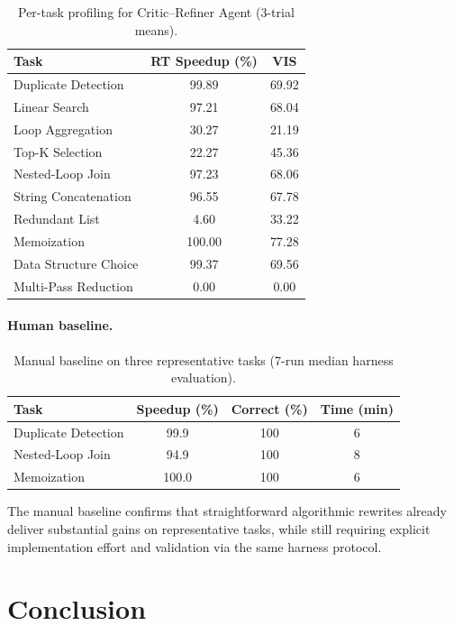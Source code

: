 \documentclass{article}
\begin{document}
\begin{table}[h]
\centering
\caption{Per-task profiling for Critic--Refiner Agent (3-trial means).}
\label{tab:agent_pertask}
\small
\begin{tabular}{lcc}
\toprule
\textbf{Task} & \textbf{RT Speedup (\%)} & \textbf{VIS} \\
\midrule
Duplicate Detection   & 99.89 & 69.92 \\
Linear Search         & 97.21 & 68.04 \\
Loop Aggregation      & 30.27 & 21.19 \\
Top-K Selection       & 22.27 & 45.36 \\
Nested-Loop Join      & 97.23 & 68.06 \\
String Concatenation  & 96.55 & 67.78 \\
Redundant List        & 4.60  & 33.22 \\
Memoization           & 100.00 & 77.28 \\
Data Structure Choice & 99.37 & 69.56 \\
Multi-Pass Reduction  & 0.00  & 0.00 \\
\bottomrule
\end{tabular}
\end{table}

\paragraph{Human baseline.}
\begin{table}[H]
\centering
\caption{Manual baseline on three representative tasks (7-run median harness evaluation).}
\small
\begin{tabular}{lccc}
\toprule
Task & Speedup (\%) & Correct (\%) & Time (min) \\
\midrule
Duplicate Detection & 99.9 & 100 & 6 \\
Nested-Loop Join    & 94.9 & 100 & 8 \\
Memoization         & 100.0 & 100 & 6 \\
\bottomrule
\end{tabular}
\end{table}
The manual baseline confirms that straightforward algorithmic rewrites already deliver substantial gains on representative tasks, while still requiring explicit implementation effort and validation via the same harness protocol.

\section{Conclusion}
\end{document}
